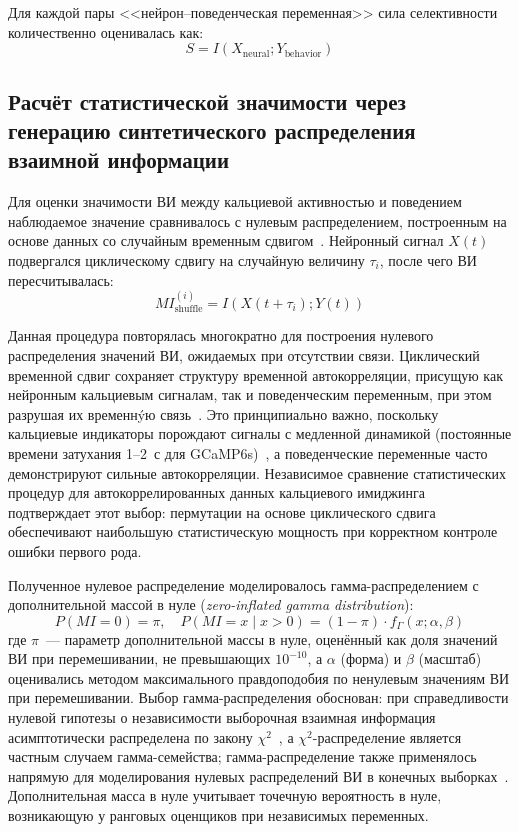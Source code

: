 Для каждой пары <<нейрон--поведенческая переменная>> сила селективности количественно оценивалась как:
\begin{equation*}
S = I(X_{\text{neural}}; Y_{\text{behavior}})
\end{equation*}


\subsection{Расчёт статистической значимости через генерацию синтетического распределения взаимной информации}\label{sec:intense_stat}

Для оценки значимости ВИ между кальциевой активностью и поведением наблюдаемое значение сравнивалось с нулевым распределением, построенным на основе данных со случайным временным сдвигом~\cite{skaggs1993information}. Нейронный сигнал $X(t)$ подвергался циклическому сдвигу на случайную величину $\tau_i$, после чего ВИ пересчитывалась:
$$MI_{\text{shuffle}}^{(i)} = I(X(t + \tau_i); Y(t))$$

Данная процедура повторялась многократно для построения нулевого распределения значений ВИ, ожидаемых при отсутствии связи. Циклический временной сдвиг сохраняет структуру временной автокорреляции, присущую как нейронным кальциевым сигналам, так и поведенческим переменным, при этом разрушая их временнýю связь~\cite{Lancaster2018}. Это принципиально важно, поскольку кальциевые индикаторы порождают сигналы с медленной динамикой (постоянные времени затухания 1--2~с для GCaMP6s)~\cite{Chen2013}, а поведенческие переменные часто демонстрируют сильные автокорреляции. Независимое сравнение статистических процедур для автокоррелированных данных кальциевого имиджинга~\cite{NevjenDunn2024} подтверждает этот выбор: пермутации на основе циклического сдвига обеспечивают наибольшую статистическую мощность при корректном контроле ошибки первого рода.

Полученное нулевое распределение моделировалось гамма-распределением с дополнительной массой в нуле (\textit{zero-inflated gamma distribution}):
$$P(MI = 0) = \pi, \quad P(MI = x \mid x > 0) = (1 - \pi) \cdot f_\Gamma(x; \alpha, \beta)$$
где $\pi$~--- параметр дополнительной массы в нуле, оценённый как доля значений ВИ при перемешивании, не превышающих $10^{-10}$, а $\alpha$ (форма) и $\beta$ (масштаб) оценивались методом максимального правдоподобия по ненулевым значениям ВИ при перемешивании. Выбор гамма-распределения обоснован: при справедливости нулевой гипотезы о независимости выборочная взаимная информация асимптотически распределена по закону $\chi^2$~\cite{Cover2006}, а $\chi^2$-распределение является частным случаем гамма-семейства; гамма-распределение также применялось напрямую для моделирования нулевых распределений ВИ в конечных выборках~\cite{hutter2001distribution}. Дополнительная масса в нуле учитывает точечную вероятность в нуле, возникающую у ранговых оценщиков при независимых переменных.

